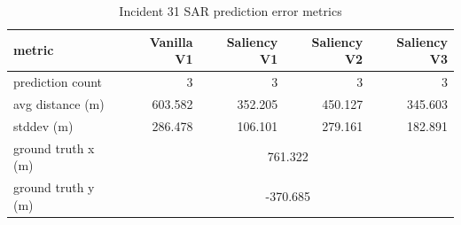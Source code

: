 \begin{table}[ht]
\centering
\caption{Incident 31 SAR prediction error metrics}
\label{tab:sar-incident-31}
\begin{tabular}{lrrrr}
\hline
metric & Vanilla V1 & Saliency V1 & Saliency V2 & Saliency V3 \\
\hline
prediction count & 3 & 3 & 3 & 3 \\
avg distance (m) & 603.582 & 352.205 & 450.127 & 345.603 \\
stddev (m) & 286.478 & 106.101 & 279.161 & 182.891 \\
ground truth x (m) & \multicolumn{4}{c}{761.322} \\
ground truth y (m) & \multicolumn{4}{c}{-370.685} \\
\hline
\end{tabular}
\end{table}
